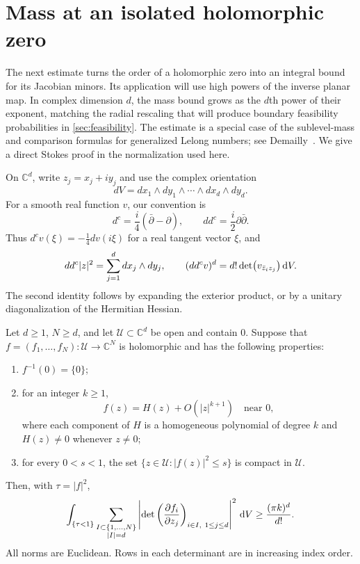 \section{Mass at an isolated holomorphic zero}
\label{sec:holomorphic-mass}

The next estimate turns the order of a holomorphic zero into an integral bound for its Jacobian minors. Its application will use high powers of the inverse planar map. In complex dimension $d$, the mass bound grows as the $d$th power of their exponent, matching the radial rescaling that will produce boundary feasibility probabilities in \cref{sec:feasibility}. The estimate is a special case of the sublevel-mass and comparison formulas for generalized Lelong numbers; see Demailly~\cite[Sections~3 and~5]{Demailly1993}. We give a direct Stokes proof in the normalization used here.

On $\mathbb{C}^d$, write $z_j=x_j+iy_j$ and use the complex orientation
\[
dV=dx_1\wedge dy_1\wedge\cdots\wedge dx_d\wedge dy_d.
\]
For a smooth real function $v$, our convention is
\begin{equation}\label{eq:mass-dc-convention}
d^c=\frac{i}{4}(\bar\partial-\partial),
\qquad dd^c=\frac{i}{2}\partial\bar\partial.
\end{equation}
Thus $d^cv(\xi)=-\tfrac14dv(i\xi)$ for a real tangent vector $\xi$, and
\begin{equation}\label{eq:mass-volume-normalization}
dd^c|z|^2=\sum_{j=1}^d dx_j\wedge dy_j,
\qquad
(dd^cv)^d=d!\det(v_{\bar z_i z_j})\,\mathrm{d} V.
\end{equation}
The second identity follows by expanding the exterior product, or by a unitary diagonalization of the Hermitian Hessian.

\begin{lemma}\label{lem:holomorphic-mass}
Let $d\geq1$, $N\geq d$, and let $\mathcal{U}\subset\mathbb{C}^d$ be open and contain $0$. Suppose that $f=(f_1,\ldots,f_N):\mathcal{U}\to\mathbb{C}^N$ is holomorphic and has the following properties:
\begin{enumerate}
\item $f^{-1}(0)=\{0\}$;
\item for an integer $k\geq1$,
\[
f(z)=H(z)+O(|z|^{k+1})\quad\text{near }0,
\]
where each component of $H$ is a homogeneous polynomial of degree $k$ and $H(z)\ne0$ whenever $z\ne0$;
\item for every $0<s<1$, the set
$\{z\in\mathcal{U}:|f(z)|^2\leq s\}$ is compact in $\mathcal{U}$.
\end{enumerate}
Then, with $\tau=|f|^2$,
\begin{equation}\label{eq:holomorphic-minor-mass}
\int_{\{\tau<1\}}
 \sum_{\substack{I\subset\{1,\ldots,N\}\\|I|=d}}
 \left|\det\left(\frac{\partial f_i}{\partial z_j}\right)_{
                       i\in I,\ 1\leq j\leq d}\right|^2\,\mathrm{d} V
\geq \frac{(\pi k)^d}{d!}.
\end{equation}
All norms are Euclidean. Rows in each determinant are in increasing index order.
\end{lemma}

